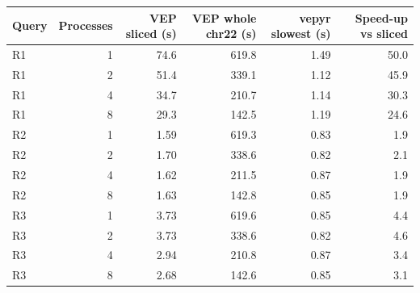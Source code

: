 \begin{tabular}{lrrrrr}
\toprule
Query & Processes & VEP sliced (s) & VEP whole chr22 (s) & vepyr slowest (s) & Speed-up vs sliced \\
\midrule
R1 & 1 & 74.6 & 619.8 & 1.49 & 50.0 \\
R1 & 2 & 51.4 & 339.1 & 1.12 & 45.9 \\
R1 & 4 & 34.7 & 210.7 & 1.14 & 30.3 \\
R1 & 8 & 29.3 & 142.5 & 1.19 & 24.6 \\
R2 & 1 & 1.59 & 619.3 & 0.83 & 1.9 \\
R2 & 2 & 1.70 & 338.6 & 0.82 & 2.1 \\
R2 & 4 & 1.62 & 211.5 & 0.87 & 1.9 \\
R2 & 8 & 1.63 & 142.8 & 0.85 & 1.9 \\
R3 & 1 & 3.73 & 619.6 & 0.85 & 4.4 \\
R3 & 2 & 3.73 & 338.6 & 0.82 & 4.6 \\
R3 & 4 & 2.94 & 210.8 & 0.87 & 3.4 \\
R3 & 8 & 2.68 & 142.6 & 0.85 & 3.1 \\
\bottomrule
\end{tabular}
